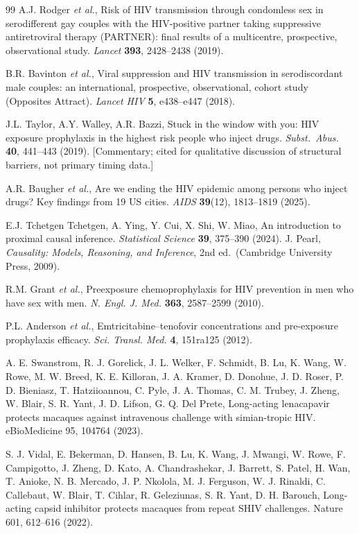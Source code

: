 \documentclass[10pt,letterpaper]{article}
\theoremstyle{definition}
\theoremstyle{remark}
\begin{document}
\begin{thebibliography}{99}
A.J. Rodger \textit{et al.}, Risk of HIV transmission through condomless sex in serodifferent gay couples with the HIV-positive partner taking suppressive antiretroviral therapy (PARTNER): final results of a multicentre, prospective, observational study. \textit{Lancet} \textbf{393}, 2428--2438 (2019).

B.R. Bavinton \textit{et al.}, Viral suppression and HIV transmission in serodiscordant male couples: an international, prospective, observational, cohort study (Opposites Attract). \textit{Lancet HIV} \textbf{5}, e438--e447 (2018).

J.L. Taylor, A.Y. Walley, A.R. Bazzi, Stuck in the window with you: HIV exposure prophylaxis in the highest risk people who inject drugs. \textit{Subst.\ Abus.} \textbf{40}, 441--443 (2019). [Commentary; cited for qualitative discussion of structural barriers, not primary timing data.]

A.R. Baugher \textit{et al.}, Are we ending the HIV epidemic among persons who inject drugs? Key findings from 19 US cities. \textit{AIDS} \textbf{39}(12), 1813--1819 (2025). 

E.J. Tchetgen Tchetgen, A. Ying, Y. Cui, X. Shi, W. Miao, An introduction to proximal causal inference. \textit{Statistical Science} \textbf{39}, 375--390 (2024).
J. Pearl, \textit{Causality: Models, Reasoning, and Inference}, 2nd ed.\ (Cambridge University Press, 2009).

R.M. Grant \textit{et al.}, Preexposure chemoprophylaxis for HIV prevention in men who have sex with men. \textit{N. Engl. J. Med.} \textbf{363}, 2587--2599 (2010).

P.L. Anderson \textit{et al.}, Emtricitabine--tenofovir concentrations and pre-exposure prophylaxis efficacy. \textit{Sci. Transl. Med.} \textbf{4}, 151ra125 (2012).

A. E. Swanstrom, R. J. Gorelick, J. L. Welker, F. Schmidt, B. Lu, K. Wang, W. Rowe, M. W. Breed, K. E. Killoran, J. A. Kramer, D. Donohue, J. D. Roser, P. D. Bieniasz, T. Hatziioannou, C. Pyle, J. A. Thomas, C. M. Trubey, J. Zheng, W. Blair, S. R. Yant, J. D. Lifson, G. Q. Del Prete, Long-acting lenacapavir protects macaques against intravenous challenge with simian-tropic HIV. eBioMedicine 95, 104764 (2023).

S. J. Vidal, E. Bekerman, D. Hansen, B. Lu, K. Wang, J. Mwangi, W. Rowe, F. Campigotto, J. Zheng, D. Kato, A. Chandrashekar, J. Barrett, S. Patel, H. Wan, T. Anioke, N. B. Mercado, J. P. Nkolola, M. J. Ferguson, W. J. Rinaldi, C. Callebaut, W. Blair, T. Cihlar, R. Geleziunas, S. R. Yant, D. H. Barouch, Long-acting capsid inhibitor protects macaques from repeat SHIV challenges. Nature 601, 612–616 (2022).


\end{thebibliography}
\end{document}
